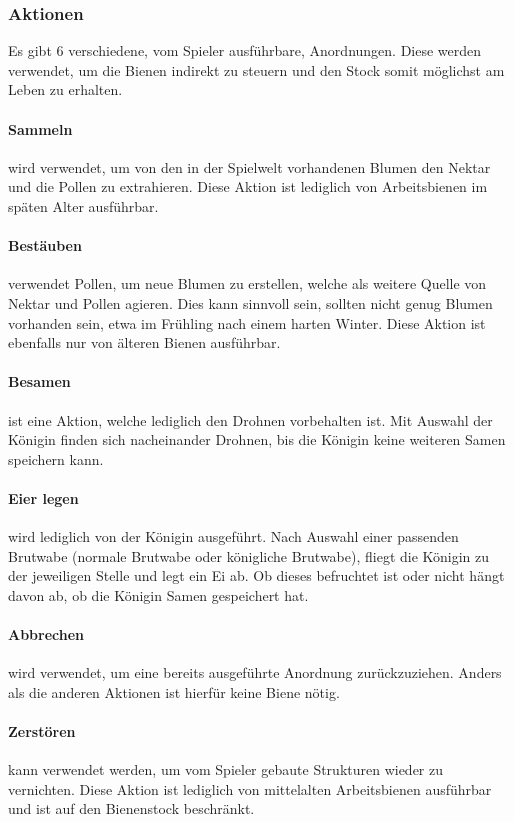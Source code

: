 \subsubsection{Aktionen}
Es gibt 6 verschiedene, vom Spieler ausführbare, Anordnungen. Diese werden verwendet, um die Bienen indirekt zu steuern und den Stock somit möglichst am Leben zu erhalten.

\paragraph{Sammeln} wird verwendet, um von den in der Spielwelt vorhandenen Blumen den Nektar und die Pollen zu extrahieren. Diese Aktion ist lediglich von Arbeitsbienen im späten Alter ausführbar.

\paragraph{Bestäuben} verwendet Pollen, um neue Blumen zu erstellen, welche als weitere Quelle von Nektar und Pollen agieren. Dies kann sinnvoll sein, sollten nicht genug Blumen vorhanden sein, etwa im Frühling nach einem harten Winter. Diese Aktion ist ebenfalls nur von älteren Bienen ausführbar.

\paragraph{Besamen} ist eine Aktion, welche lediglich den Drohnen vorbehalten ist. Mit Auswahl der Königin finden sich nacheinander Drohnen, bis die Königin keine weiteren Samen speichern kann.

\paragraph{Eier legen} wird lediglich von der Königin ausgeführt. Nach Auswahl einer passenden Brutwabe (normale Brutwabe oder königliche Brutwabe), fliegt die Königin zu der jeweiligen Stelle und legt ein Ei ab. Ob dieses befruchtet ist oder nicht hängt davon ab, ob die Königin Samen gespeichert hat.

\paragraph{Abbrechen} wird verwendet, um eine bereits ausgeführte Anordnung zurückzuziehen. Anders als die anderen Aktionen ist hierfür keine Biene nötig.

\paragraph{Zerstören} kann verwendet werden, um vom Spieler gebaute Strukturen wieder zu vernichten. Diese Aktion ist lediglich von mittelalten Arbeitsbienen ausführbar und ist auf den Bienenstock beschränkt.

